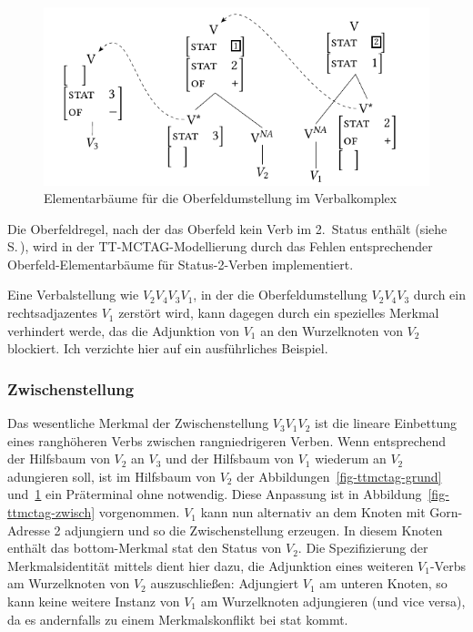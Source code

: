 \begin{figure}[t]
\centering
\includegraphics{graphics/abb711.pdf}
\caption{\label{fig-ttmctag-ober}Elementarbäume für die Oberfeldumstellung im Verbalkomplex}
\end{figure}

Die Oberfeldregel, nach der das Oberfeld kein Verb im 2.~Status enthält (siehe S.\,\pageref{ex-ofr}), wird in der TT-MCTAG-Modellierung durch das Fehlen entsprechender Oberfeld-Elementarbäume für Status-2-Verben implementiert.

Eine Verbalstellung wie $V_2 V_4 V_3 V_1$, in der die Oberfeldumstellung $V_2 V_4 V_3$ durch ein rechtsadjazentes $V_1$ zerstört wird, kann dagegen durch ein spezielles Merkmal verhindert werde, das die Adjunktion von $V_1$ an den Wurzelknoten von $V_2$ blockiert. Ich verzichte hier auf ein ausführliches Beispiel.


\subsubsection*{Zwischenstellung}

Das wesentliche Merkmal der Zwischenstellung $V_3 V_1 V_2$ ist die lineare Einbettung eines ranghöheren Verbs zwischen rangniedrigeren Verben. Wenn entsprechend der Hilfsbaum von $V_2$ an $V_3$ und der Hilfsbaum von $V_1$ wiederum an $V_2$ adungieren soll, ist im Hilfsbaum von $V_2$ der Abbildungen~\ref{fig-ttmctag-grund} und~\ref{fig-ttmctag-ober} ein Präterminal ohne  notwendig. Diese Anpassung ist in Abbildung~\ref{fig-ttmctag-zwisch} vorgenommen. $V_1$ kann nun alternativ an dem Knoten mit Gorn-Adresse 2 adjungiern und so die Zwischenstellung erzeugen. In diesem Knoten enthält das {\sc bottom}-Merkmal {\sc stat} den Status von $V_2$. Die Spezifizierung der Merkmalsidentität mittels  dient hier dazu, die Adjunktion eines weiteren $V_1$-Verbs am Wurzelknoten von $V_2$ auszuschlie\ss en: Adjungiert $V_1$ am unteren Knoten, so kann keine weitere Instanz von $V_1$ am Wurzelknoten adjungieren (und vice versa), da es andernfalls zu einem Merkmalskonflikt bei {\sc stat} kommt.          


